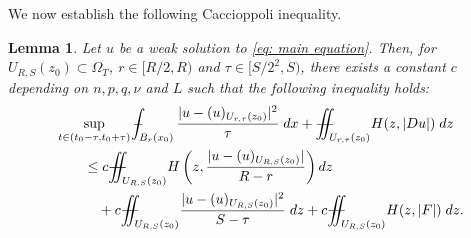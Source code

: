 \documentclass[11pt,oneside, english,reqno,twoside a4paper]{amsart}
\newtheorem{lemma}{Lemma}[section]
\theoremstyle{definition}
\numberwithin{theorem}{section}
\numberwithin{equation}{section}
\def\Xint#1{\mathchoice
	{\XXint\displaystyle\textstyle{#1}}%
	{\XXint\textstyle\scriptstyle{#1}}%
	{\XXint\scriptstyle\scriptscriptstyle{#1}}%
	{\XXint\scriptscriptstyle\scriptscriptstyle{#1}}%
	\!\int}
\def\XXint#1#2#3{{\setbox0=\hbox{$#1{#2#3}{\int}$}
		\vcenter{\hbox{$#2#3$}}\kern-.50\wd0}}
\def\dashint{\Xint-}
\newcommand{\iintss}{{\int\hspace{-0.28cm}\int}}
\newcommand{ \miints }{{\iintss\hspace{-0.56cm} -\hspace{-0.15cm}-}}
\newcommand{\miint}[1]{{\miints_{\hspace{-0.13cm}#1}}}
\begin{document}
We now establish the following Caccioppoli inequality. 
\begin{lemma} \label{lem : the Caccioppoli inequality}
    Let $u$ be a weak solution to \eqref{eq: main equation}. Then, for $U_{R,S}(z_0)\subset \Omega_T$, $r\in [R/2,R)$ and $\tau\in[S/2^2,S)$, there exists a constant $c$ depending on $n,p,q,\nu$ and $L$ such that the following inequality holds: 
    \begin{align*}
        &\sup_{t\in(t_0-\tau, t_0+\tau)}\dashint_{B_r(x_0)} \frac{|u-(u)_{U_{r,\tau}(z_0)}|^2}{\tau}\; dx +\miint{U_{r,\tau}(z_0)}H(z,|Du|)\;dz\\
        &\qquad \leq c\miint{U_{R,S}(z_0)}   H\left(z,\frac{|u-(u)_{U_{R,S}(z_0)}|}{R-r}\right) dz\\
        &\quad\qquad + c\miint{U_{R,S}(z_0)}\frac{|u-(u)_{U_{R,S}(z_0)}|^2}{S-\tau}\;dz +c\miint{U_{R,S}(z_0)} H(z,|F|) \;dz.
    \end{align*}
\end{lemma}  
\end{document}

